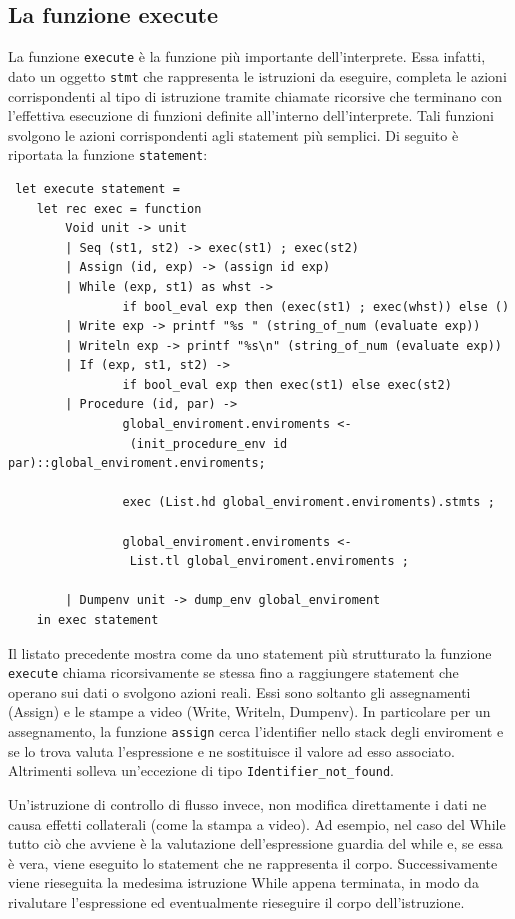 \documentclass[a4paper,10pt]{article}
\begin{document}
\subsection{La funzione execute}
La funzione \texttt{execute} \`e la funzione pi\`u importante dell'interprete.
Essa infatti, dato un oggetto \texttt{stmt} che rappresenta le istruzioni da
eseguire, completa le azioni corrispondenti al tipo di istruzione tramite 
chiamate ricorsive che terminano con l'effettiva esecuzione di funzioni 
definite all'interno dell'interprete. Tali funzioni svolgono le azioni
corrispondenti agli statement pi\`u semplici. Di seguito \`e riportata la
funzione \texttt{statement}:
\begin{verbatim}
 let execute statement =
    let rec exec = function
        Void unit -> unit
        | Seq (st1, st2) -> exec(st1) ; exec(st2)
        | Assign (id, exp) -> (assign id exp)
        | While (exp, st1) as whst ->
                if bool_eval exp then (exec(st1) ; exec(whst)) else ()
        | Write exp -> printf "%s " (string_of_num (evaluate exp))
        | Writeln exp -> printf "%s\n" (string_of_num (evaluate exp))
        | If (exp, st1, st2) ->
                if bool_eval exp then exec(st1) else exec(st2)
        | Procedure (id, par) ->
                global_enviroment.enviroments <-
                 (init_procedure_env id par)::global_enviroment.enviroments;

                exec (List.hd global_enviroment.enviroments).stmts ;

                global_enviroment.enviroments <- 
                 List.tl global_enviroment.enviroments ;

        | Dumpenv unit -> dump_env global_enviroment
    in exec statement
\end{verbatim}
Il listato precedente mostra come da uno statement pi\`u strutturato la funzione
\texttt{execute} chiama ricorsivamente se stessa fino a raggiungere statement
che operano sui dati o svolgono azioni reali. Essi sono soltanto gli
assegnamenti (Assign) e le stampe a video (Write, Writeln, Dumpenv).
In particolare per un assegnamento, la funzione \texttt{assign} cerca
l'identifier nello stack degli enviroment e se lo trova valuta l'espressione e
ne sostituisce il valore ad esso associato. Altrimenti solleva un'eccezione di
tipo \texttt{Identifier\_not\_found}.

Un'istruzione di controllo di flusso invece, non modifica direttamente i dati 
ne causa effetti collaterali (come la stampa a video). Ad esempio, nel caso del
 While tutto ci\`o che avviene \`e la valutazione dell'espressione guardia del 
while e, se essa \`e vera, viene eseguito lo statement che ne rappresenta
il corpo. Successivamente viene rieseguita la medesima istruzione While appena
terminata, in modo da rivalutare l'espressione ed eventualmente rieseguire il
corpo dell'istruzione.
\end{document}
